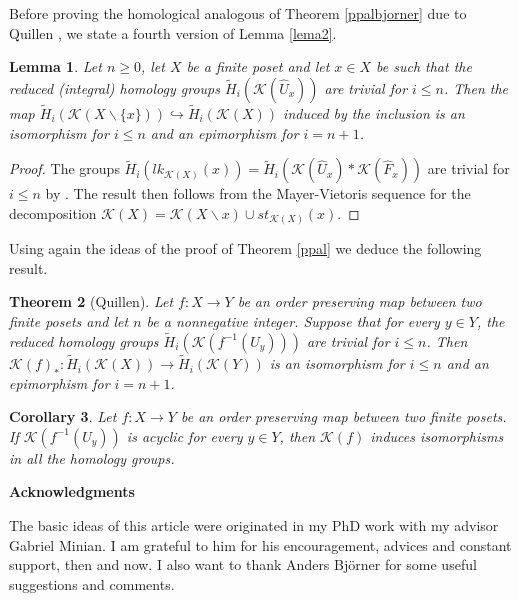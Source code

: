 \documentclass[11pt,twoside]{amsart}
\theoremstyle{plain}
\newtheorem{lema}{Lemma}[section]
\newtheorem{teo}[lema]{Theorem}
\newtheorem{coro}[lema]{Corollary}
\theoremstyle{remark}
\theoremstyle{definition}
\newcommand{\kp}{\mathcal{K}}
\begin{document}
Before proving the homological analogous of Theorem \ref{ppalbjorner} due to Quillen \cite{Qui}, we state a fourth version of Lemma \ref{lema2}.

\begin{lema}\label{lema2homo}
Let $n\ge 0$, let $X$ be a finite poset and let $x\in X$ be such that the reduced (integral) homology groups $\widetilde{H}_i(\kp(\hat{U}_x))$ are trivial for $i\le n$. Then the map $\widetilde{H}_i(\kp(X\smallsetminus \{x\})) \hookrightarrow \widetilde{H}_i(\kp(X))$ induced by the inclusion is an isomorphism for $i\le n$ and an epimorphism for $i=n+1$.
\end{lema}
\begin{proof}
The groups $\widetilde{H}_i(lk_{\kp (X)}(x))=\widetilde{H}_i(\kp (\hat{U}_x)*\kp(\hat{F}_x))$ are trivial for $i\le n$ by \cite[Lemma 2.1]{Mil}. The result then follows from the Mayer-Vietoris sequence for the decomposition $\kp (X)=\kp (X\smallsetminus {x})\cup st_{\kp (X)}(x)$. 
\end{proof}

Using again the ideas of the proof of Theorem \ref{ppal} we deduce the following result.

\begin{teo}[Quillen]
Let $f:X\to Y$ be an order preserving map between two finite posets and let $n$ be a nonnegative integer. Suppose that for every $y\in Y$, the reduced homology groups $\widetilde{H}_i(\kp(f^{-1}(U_y)))$ are trivial for $i\le n$. Then $\kp(f)_*:\widetilde{H}_i(\kp(X))\to \widetilde{H}_i(\kp(Y))$ is an isomorphism for $i\le n$ and an epimorphism for $i=n+1$. 
\end{teo}

\begin{coro}
Let $f:X\to Y$ be an order preserving map between two finite posets. If $\kp (f^{-1}(U_y))$ is acyclic for every $y\in Y$, then $\kp (f)$ induces isomorphisms in all the homology groups.
\end{coro}


\textbf{Acknowledgments}
\medskip

The basic ideas of this article were originated in my PhD work with my advisor Gabriel Minian. I am grateful to him for his encouragement, advices and constant support, then and now. I also want to thank Anders Bj\"orner for some useful suggestions and comments.
\end{document}

